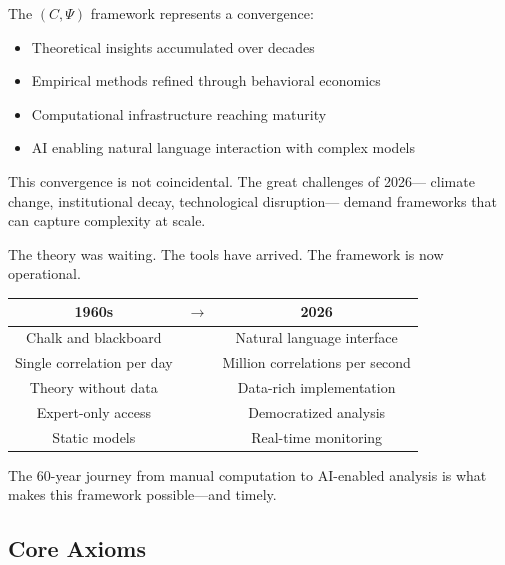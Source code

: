 The $(C, \Psi)$ framework represents a convergence:
\begin{itemize}
  \item Theoretical insights accumulated over decades
  \item Empirical methods refined through behavioral economics
  \item Computational infrastructure reaching maturity
  \item AI enabling natural language interaction with complex models
\end{itemize}

This convergence is not coincidental. The great challenges of 2026---
climate change, institutional decay, technological disruption---
demand frameworks that can capture complexity at scale.

The theory was waiting. The tools have arrived.
The framework is now operational.

\begin{center}
\renewcommand{\arraystretch}{1.3}
\begin{tabular}{ccc}
\hline
\textbf{1960s} & $\longrightarrow$ & \textbf{2026} \\
\hline
Chalk and blackboard & & Natural language interface \\
Single correlation per day & & Million correlations per second \\
Theory without data & & Data-rich implementation \\
Expert-only access & & Democratized analysis \\
Static models & & Real-time monitoring \\
\hline
\end{tabular}
\end{center}

The 60-year journey from manual computation to AI-enabled analysis
is what makes this framework possible---and timely.





\subsection{Core Axioms}
\label{sec:hrc-axioms}


